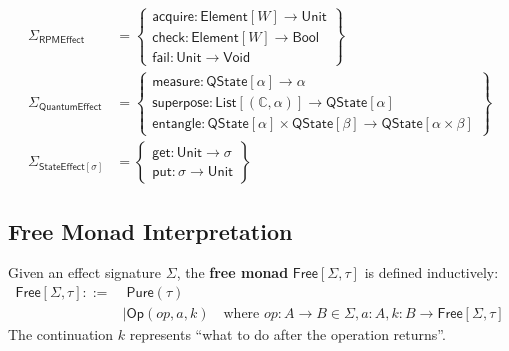 \begin{example}
\label{ex:tks-effect-sigs}
\begin{align}
\Sigma_{\mathsf{RPMEffect}} &= \left\{
  \begin{array}{l}
  \mathsf{acquire} : \mathsf{Element}[W] \to \mathsf{Unit} \\
  \mathsf{check} : \mathsf{Element}[W] \to \mathsf{Bool} \\
  \mathsf{fail} : \mathsf{Unit} \to \mathsf{Void}
  \end{array}
\right\} \\[2ex]
\Sigma_{\mathsf{QuantumEffect}} &= \left\{
  \begin{array}{l}
  \mathsf{measure} : \mathsf{QState}[\alpha] \to \alpha \\
  \mathsf{superpose} : \mathsf{List}[(\mathbb{C}, \alpha)] \to \mathsf{QState}[\alpha] \\
  \mathsf{entangle} : \mathsf{QState}[\alpha] \times \mathsf{QState}[\beta] \to \mathsf{QState}[\alpha \times \beta]
  \end{array}
\right\} \\[2ex]
\Sigma_{\mathsf{StateEffect}[\sigma]} &= \left\{
  \begin{array}{l}
  \mathsf{get} : \mathsf{Unit} \to \sigma \\
  \mathsf{put} : \sigma \to \mathsf{Unit}
  \end{array}
\right\}
\end{align}
\end{example}

\subsection{Free Monad Interpretation}
\label{subsec:free-monad}

\begin{definition}
\label{def:free-monad}
Given an effect signature $\Sigma$, the \textbf{free monad} $\mathsf{Free}[\Sigma, \tau]$ is defined inductively:
\begin{align}
\mathsf{Free}[\Sigma, \tau] ::=&\; \mathsf{Pure}(\tau) \\
    &\mid \mathsf{Op}(\mathit{op}, a, k) \quad \text{where } \mathit{op} : A \to B \in \Sigma, a : A, k : B \to \mathsf{Free}[\Sigma, \tau]
\end{align}
The continuation $k$ represents ``what to do after the operation returns''.
\end{definition}

